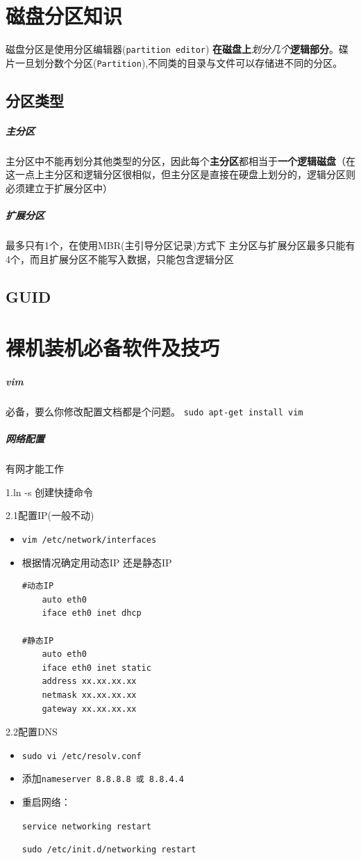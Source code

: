 \documentclass[UTF8,a4paper,12pt]{ctexbook}
\begin{document}
		\section{磁盘分区知识}
			 磁盘分区是使用分区编辑器(\verb|partition editor|) \textbf{在磁盘上}\textit{划分几个}\textbf{逻辑部分}。碟片一旦划分数个分区(\verb|Partition|),不同类的目录与文件可以存储进不同的分区。
			 
			 \subsection{分区类型}
				 \subparagraph{主分区}
					 主分区中不能再划分其他类型的分区，因此每个\textbf{主分区}都相当于\textbf{一个逻辑磁盘}（在这一点上主分区和逻辑分区很相似，但主分区是直接在硬盘上划分的，逻辑分区则必须建立于扩展分区中）
					 
				 \subparagraph{扩展分区}
					 最多只有1个，在使用MBR(主引导分区记录)方式下 主分区与扩展分区最多只能有4个，而且扩展分区不能写入数据，只能包含逻辑分区
					 
			\subsection{GUID}
	\section{裸机装机必备软件及技巧}
		\subparagraph{vim}必备，要么你修改配置文档都是个问题。
			\verb|sudo apt-get install vim|
		\subparagraph{网络配置}有网才能工作
			
			1.ln -s 创建快捷命令
			
			2.1配置IP(一般不动)
			\begin{itemize}[itemindent = 1em]
				\item \verb|vim /etc/network/interfaces|
				\item 根据情况确定用动态IP 还是静态IP 
				\begin{lstlisting}
#动态IP 
	auto eth0
	iface eth0 inet dhcp
	
#静态IP
	auto eth0
	iface eth0 inet static
	address xx.xx.xx.xx
	netmask xx.xx.xx.xx
	gateway xx.xx.xx.xx
				\end{lstlisting}
			\end{itemize}
			
			2.2配置DNS
			\begin{itemize}[itemindent = 1em]
				\item \verb|sudo vi /etc/resolv.conf|
				\item 添加\verb|nameserver 8.8.8.8 或 8.8.4.4|
				\item 重启网络：
				
				\verb|service networking restart|
				
				\verb|sudo /etc/init.d/networking restart|
			\end{itemize}
			
\end{document}
